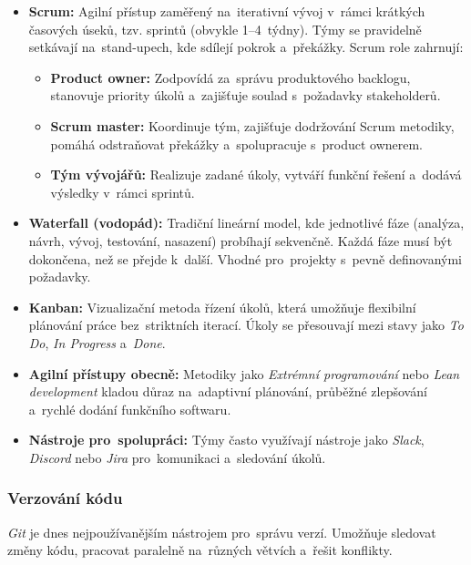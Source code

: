 \documentclass[male,czech,api_bc]{kitheses}
\begin{document}
\begin{itemize}
	\item \textbf{Scrum:} Agilní přístup zaměřený na~iterativní vývoj v~rámci krátkých časových úseků, tzv. sprintů (obvykle 1--4~týdny). Týmy se pravidelně setkávají na~stand-upech, kde sdílejí pokrok a~překážky. Scrum role zahrnují:
	\begin{itemize}
		\item \textbf{Product owner:} Zodpovídá za~správu produktového backlogu, stanovuje priority úkolů a~zajišťuje soulad s~požadavky stakeholderů.
		\item \textbf{Scrum master:} Koordinuje tým, zajišťuje dodržování Scrum metodiky, pomáhá odstraňovat překážky a~spolupracuje s~product ownerem.
		\item \textbf{Tým vývojářů:} Realizuje zadané úkoly, vytváří funkční řešení a~dodává výsledky v~rámci sprintů.
	\end{itemize}
	
	\item \textbf{Waterfall (vodopád):} Tradiční lineární model, kde jednotlivé fáze (analýza, návrh, vývoj, testování, nasazení) probíhají sekvenčně. Každá fáze musí být dokončena, než se přejde k~další. Vhodné pro~projekty s~pevně definovanými požadavky.
	
	\item \textbf{Kanban:} Vizualizační metoda řízení úkolů, která umožňuje flexibilní plánování práce bez~striktních iterací. Úkoly se přesouvají mezi stavy jako \textit{To Do}, \textit{In Progress} a~\textit{Done}.
	
	\item \textbf{Agilní přístupy obecně:} Metodiky jako \textit{Extrémní programování} nebo \textit{Lean development} kladou důraz na~adaptivní plánování, průběžné zlepšování a~rychlé dodání funkčního softwaru.
	
	\item \textbf{Nástroje pro~spolupráci:} Týmy často využívají nástroje jako \textit{Slack}, \textit{Discord} nebo \textit{Jira} pro~komunikaci a~sledování úkolů.
\end{itemize}

\subsubsection{Verzování kódu}

\textit{Git} je dnes nejpoužívanějším nástrojem pro~správu verzí. Umožňuje sledovat změny kódu, pracovat paralelně na~různých větvích a~řešit konflikty.
\end{document}
